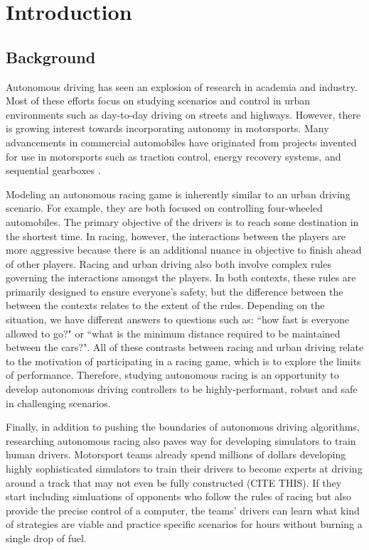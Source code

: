\chapter{Introduction} \label{chapter:intro}
\section{Background} 
Autonomous driving has seen an explosion of research in academia and industry. Most of these efforts focus on studying scenarios and control in urban environments such as day-to-day driving on streets and highways. However, there is growing interest towards incorporating autonomy in motorsports. Many advancements in commercial automobiles have originated from projects invented for use in motorsports such as traction control, energy recovery systems, and sequential gearboxes \cite{racingadvances}. 

Modeling an autonomous racing game is inherently similar to an urban driving scenario. For example, they are both focused on controlling four-wheeled automobiles. The primary objective of the drivers is to reach some destination in the shortest time. In racing, however, the interactions between the players are more aggressive because there is an additional nuance in objective to finish ahead of other players. Racing and urban driving also both involve complex rules governing the interactions amongst the players. In both contexts, these rules are primarily designed to ensure everyone's safety, but the difference between the between the contexts relates to the extent of the rules. Depending on the situation, we have different answers to questions such as: ``how fast is everyone allowed to go?" or ``what is the minimum distance required to be maintained between the cars?". All of these contrasts between racing and urban driving relate to the motivation of participating in a racing game, which is to explore the limits of performance. Therefore, studying autonomous racing is an opportunity to develop autonomous driving controllers to be highly-performant, robust and safe in challenging scenarios. 

Finally, in addition to pushing the boundaries of autonomous driving algorithms, researching autonomous racing also paves way for developing simulators to train human drivers. Motorsport teams already spend millions of dollars developing highly sophisticated simulators to train their drivers to become experts at driving around a track that may not even be fully constructed (CITE THIS). If they start including simluations of opponents who follow the rules of racing but also provide the precise control of a computer, the teams' drivers can learn what kind of strategies are viable and practice specific scenarios for hours without burning a single drop of fuel.


